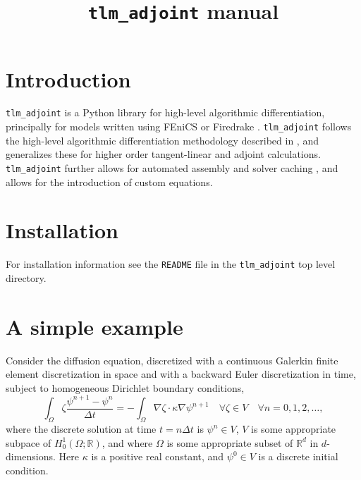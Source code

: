 \documentclass[11pt]{article}
\title{\texttt{tlm\_adjoint} manual}
\begin{document}
\maketitle

\tableofcontents

\section{Introduction}

\texttt{tlm\_adjoint} \citep{maddison2019} is a Python library for high-level
algorithmic differentiation, principally for models written using FEniCS
\citep{logg2012,alnaes2015} or Firedrake \citep{rathgeber2016}.
\texttt{tlm\_adjoint} follows the high-level algorithmic differentiation
methodology described in \citet{farrell2013}, and generalizes these for higher
order tangent-linear and adjoint calculations. \texttt{tlm\_adjoint} further
allows for automated assembly and solver caching \citep[see][]{maddison2014},
and allows for the introduction of custom equations.

\section{Installation}

For installation information see the \texttt{README} file in the
\texttt{tlm\_adjoint} top level directory.

\section{A simple example}\label{sect:diffusion}

Consider the diffusion equation, discretized with a continuous Galerkin finite
element discretization in space and with a backward Euler discretization in
time, subject to homogeneous Dirichlet boundary conditions,
\begin{equation*}
  \int_\Omega \zeta \frac{\psi^{n + 1} - \psi^n}{\Delta t}
    = -\int_\Omega \nabla \zeta \cdot \kappa \nabla \psi^{n + 1}
    \quad \forall \zeta \in V \quad \forall n = 0, 1, 2, \ldots,
\end{equation*}
where the discrete solution at time $t = n \Delta t$ is $\psi^n \in V$, $V$ is
some appropriate subpace of $H^1_0 \left( \Omega; \mathbb{R} \right)$, and
where $\Omega$ is some appropriate subset of $\mathbb{R}^d$ in $d$-dimensions.
Here $\kappa$ is a positive real constant, and $\psi^0 \in V$ is a discrete
initial condition.
\end{document}
